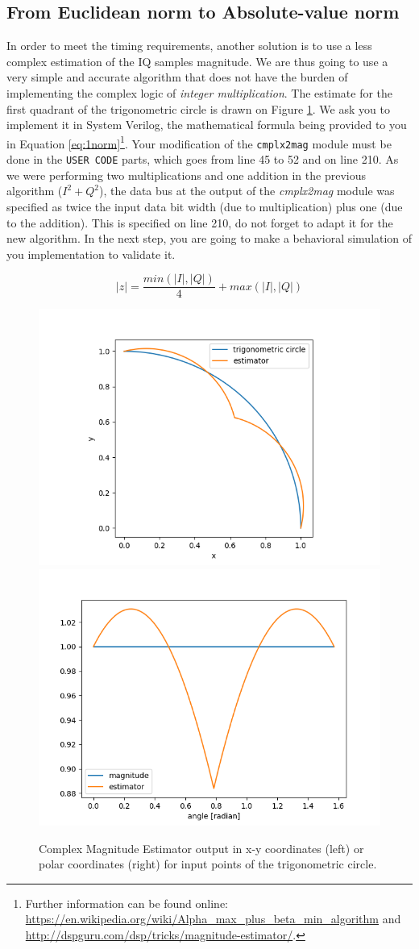 \subsection{From Euclidean norm to Absolute-value norm}

In order to meet the timing requirements, another solution is to use a less complex estimation of the IQ samples magnitude. We are thus going to use a very simple and accurate algorithm that does not have the burden of implementing the complex logic of \textit{integer multiplication}. The estimate for the first quadrant of the trigonometric circle is drawn on Figure \ref{fig:cmplx2mag}. We ask you to implement it in System Verilog, the mathematical formula being provided to you in Equation \ref{eq:1norm}\footnote{Further information can be found online: \url{https://en.wikipedia.org/wiki/Alpha_max_plus_beta_min_algorithm} and \url{http://dspguru.com/dsp/tricks/magnitude-estimator/}.}. Your modification of the \texttt{cmplx2mag} module must be done in the \texttt{USER CODE} parts, which goes from line 45 to 52 and on line 210. As we were performing two multiplications and one addition in the previous algorithm ($I^2+Q^2$), the data bus at the output of the \textit{cmplx2mag} module was specified as twice the input data bit width (due to multiplication) plus one (due to the addition). This is specified on line 210, do not forget to adapt it for the new algorithm. In the next step, you are going to make a behavioral simulation of you implementation to validate it.

\begin{equation}
    |z| = \frac{min(|I|,|Q|)}{4} + max(|I|,|Q|)
    \label{eq:1norm}
\end{equation}

\begin{figure}[!h]
    \centering
    \includegraphics[width=0.45\linewidth]{figures/trigo.png}
    \includegraphics[width=0.45\linewidth]{figures/angle.png}
    \caption{Complex Magnitude Estimator output in x-y coordinates (left) or polar coordinates (right) for input points of the trigonometric circle.}
    \label{fig:cmplx2mag}
\end{figure}

